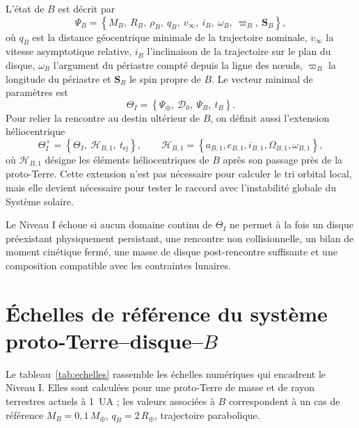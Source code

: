 \documentclass[11pt,a4paper,openany]{report}
\newcommand{\Mt}{M_{\oplus}}
\newcommand{\Rt}{R_{\oplus}}
\begin{document}
L'état de $B$ est décrit par
\begin{equation}
\Psi_B=\left\{M_B,\ R_B,\ \rho_B,\ q_B,\ v_\infty,\ i_B,\ \omega_B,\ \varpi_B,\ \mathbf{S}_B\right\},
\label{eq:PsiB}
\end{equation}
où $q_B$ est la distance géocentrique minimale de la trajectoire nominale, $v_\infty$ la vitesse
asymptotique relative, $i_B$ l'inclinaison de la trajectoire sur le plan du disque, $\omega_B$
l'argument du périastre compté depuis la ligne des nœuds, $\varpi_B$ la longitude du périastre et
$\mathbf{S}_B$ le spin propre de $B$. Le vecteur minimal de paramètres est
\begin{equation}
\Theta_I=\left\{\Psi_\oplus,\ \mathcal{D}_0,\ \Psi_B,\ t_B\right\}.
\label{eq:Theta}
\end{equation}
Pour relier la rencontre au destin ultérieur de $B$, on définit aussi l'extension héliocentrique
\begin{equation}
\Theta_I^{+}=\left\{\Theta_I,\ \mathcal{H}_{B,1},\ t_{\mathrm{ej}}\right\},
\qquad
\mathcal{H}_{B,1}=\left\{a_{B,1},e_{B,1},i_{B,1},\Omega_{B,1},\omega_{B,1}\right\},
\label{eq:Theta-plus}
\end{equation}
où $\mathcal{H}_{B,1}$ désigne les éléments héliocentriques de $B$ après son passage près de la
proto-Terre. Cette extension n'est pas nécessaire pour calculer le tri orbital local, mais elle devient
nécessaire pour tester le raccord avec l'instabilité globale du Système solaire.

\begin{falsif}
Le Niveau I échoue si aucun domaine continu de $\Theta_I$ ne permet à la fois un disque
préexistant physiquement persistant, une rencontre non collisionnelle, un bilan de moment
cinétique fermé, une masse de disque post-rencontre suffisante et une composition compatible
avec les contraintes lunaires.
\end{falsif}


\section{Échelles de référence du système proto-Terre--disque--\texorpdfstring{$B$}{B}}

Le tableau~\ref{tab:echelles} rassemble les échelles numériques qui encadrent le Niveau I. Elles
sont calculées pour une proto-Terre de masse et de rayon terrestres actuels à 1~UA ; les valeurs
associées à $B$ correspondent à un cas de référence $M_B=0{,}1\,\Mt$, $q_B=2\,\Rt$,
trajectoire parabolique.
\end{document}
